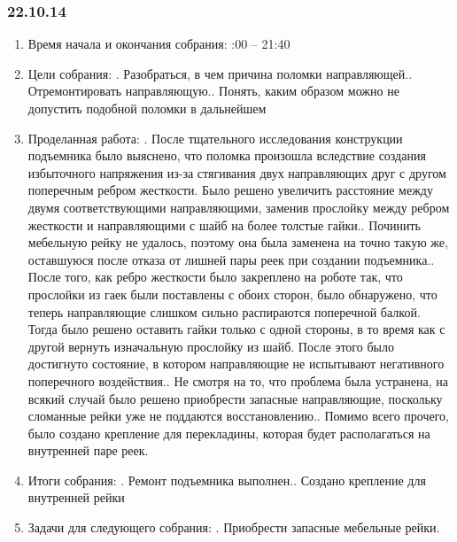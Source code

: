 \documentclass[12pt]{article}
\begin{document}
	        \subsubsection{22.10.14}
	        \begin{enumerate}
	        	\item Время начала и окончания собрания:	        		      	
	        	:00 – 21:40
	        	\item Цели собрания:
	        	.	Разобраться, в чем причина поломки направляющей..	Отремонтировать направляющую..	Понять, каким образом можно не допустить подобной поломки в дальнейшем
	        	
	        	\item Проделанная работа:
	        	.	После тщательного исследования конструкции подъемника было выяснено, что поломка произошла вследствие создания избыточного напряжения из-за стягивания двух направляющих друг с другом поперечным ребром жесткости. Было решено увеличить расстояние между двумя соответствующими направляющими, заменив прослойку между ребром жесткости и направляющими с шайб на более толстые гайки..	Починить мебельную рейку не удалось, поэтому она была заменена на точно такую же, оставшуюся после отказа от лишней пары реек при создании подъемника..	После того, как ребро жесткости было закреплено на роботе так, что прослойки из гаек были поставлены с обоих сторон, было обнаружено, что теперь направляющие слишком сильно распираются поперечной балкой. Тогда было решено оставить гайки только с одной стороны, в то время как с другой вернуть изначальную прослойку из шайб. После этого было достигнуто состояние, в котором направляющие не испытывают негативного поперечного воздействия..	Не смотря на то, что проблема была устранена, на всякий случай было решено приобрести запасные направляющие, поскольку сломанные рейки уже не поддаются восстановлению..	Помимо всего прочего, было создано крепление для перекладины, которая будет располагаться на внутренней паре реек.
	        	
	        	\item Итоги собрания:
	        	.	Ремонт подъемника выполнен..	Создано крепление для внутренней рейки	
	        	\item Задачи для следующего собрания:
	        	.	Приобрести запасные мебельные рейки.
	        \end{enumerate}
	        \newpage
\end{document}

